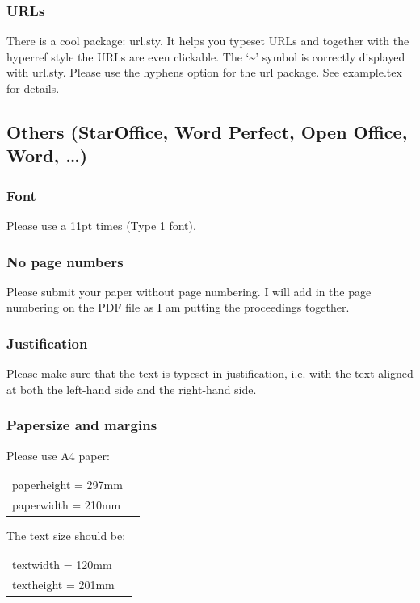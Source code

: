 \documentclass[11pt,a4paper,fleqn]{article}
\begin{document}
\subsubsection{URLs}

There is a cool package: url.sty. It helps you typeset URLs and together with the hyperref style the
URLs are even clickable. The `\~{}' symbol is correctly displayed with url.sty. Please use the
hyphens option for the url package. See example.tex for details.





\subsection{Others (StarOffice, Word Perfect, Open Office, Word, \ldots)}

\subsubsection{Font}

Please use a 11pt times (Type 1 font). 

\subsubsection{No page numbers}

Please submit your paper without page numbering.  I will add in
the page numbering on the PDF file as I am putting the
proceedings together.

\subsubsection{Justification}

Please make sure that the text is typeset in justification,
i.e. with the text aligned at both the left-hand side and the right-hand side.

\subsubsection{Papersize and margins}
\label{margins}

Please use A4 paper:
\begin{table}[H]
\begin{tabular}{@{}ll}
paperheight  = 297mm\\
paperwidth   = 210mm
\end{tabular}
\end{table}
%
The text size should be:
\begin{table}[H]
\begin{tabular}{@{}ll}
textwidth  = 120mm\\
textheight = 201mm
\end{tabular}
\end{table}
\end{document}
